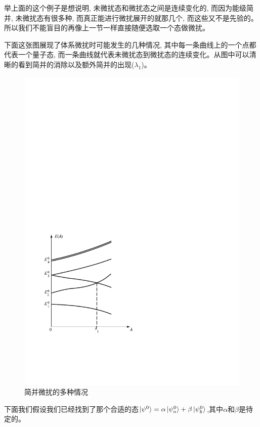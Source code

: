 \documentclass[a4paper,zihao=-4,linespread=1]{ctexrep}
\begin{document}
    举上面的这个例子是想说明, 未微扰态和微扰态之间是连续变化的, 而因为能级简并, 未微扰态有很多种, 而真正能进行微扰展开的就那几个, 而这些又不是先验的。
    所以我们不能盲目的再像上一节一样直接随便选取一个态做微扰。

    下面这张图展现了体系微扰时可能发生的几种情况, 其中每一条曲线上的一个点都代表一个量子态, 而一条曲线就代表未微扰态到微扰态的连续变化。从图中可以清晰的看到简并的消除以及额外简并的出现($\lambda_1$)。
    \begin{figure}[htbp]
        \centering
        \includegraphics[scale=0.7]{fig/7.1.pdf}
        \caption{简并微扰的多种情况}
        \label{fig:7.1}
    \end{figure} 

    下面我们假设我们已经找到了那个合适的态$\ket{\psi^0}=\alpha\ket{\psi_a^0}+\beta\ket{\psi_b^0}$,其中$\alpha$和$\beta$是待定的。
    
\end{document}
